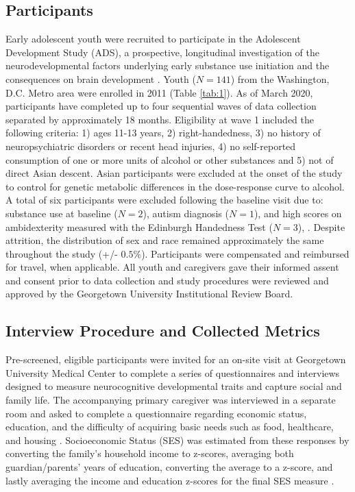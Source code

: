 \documentclass{article}%
\begin{document}
\subsection*{Participants} 
Early adolescent youth were recruited to participate in the Adolescent Development Study (ADS), a prospective, longitudinal investigation of the neurodevelopmental factors underlying early substance use initiation and the consequences on brain development \citep{Fishbein2016}. Youth ($N=141$) from the Washington, D.C. Metro area were enrolled in 2011 (Table \ref{tab:1}). As of March 2020, participants have completed up to four sequential waves of data collection separated by approximately 18 months. Eligibility at wave 1 included the following criteria: 1) ages 11-13 years, 2) right-handedness, 3) no history of neuropsychiatric disorders or recent head injuries, 4) no self-reported consumption of one or more units of alcohol or other substances and 5) not of direct Asian descent. Asian participants were excluded at the onset of the study to control for genetic metabolic differences in the dose-response curve to alcohol. A total of six participants were excluded following the baseline visit due to: substance use at baseline ($N=2$), autism diagnosis ($N=1$), and high scores on ambidexterity measured with the Edinburgh Handedness Test ($N=3$), \citep{veale2014edinburgh}. Despite attrition, the distribution of sex and race remained approximately the same throughout the study (+/- $0.5\%$). Participants were compensated and reimbursed for travel, when applicable. All youth and caregivers gave their informed assent and consent prior to data collection and study procedures were reviewed and approved by the Georgetown University Institutional Review Board. 
\subsection*{Interview Procedure and Collected Metrics} Pre-screened, eligible participants were invited for an on-site visit at Georgetown University Medical Center to complete a series of questionnaires and interviews designed to measure neurocognitive developmental traits and capture social and family life. The accompanying primary caregiver was interviewed in a separate room and asked to complete a questionnaire regarding economic status, education, and the difficulty of acquiring basic needs such as food, healthcare, and housing \citep{bornstein2003socioeconomic}. Socioeconomic Status (SES) was estimated from these responses by converting the family’s household income to z-scores, averaging both guardian/parents' years of education, converting the average to a z-score, and lastly averaging the income and education z-scores for the final SES measure \citep{manuck2010ses}.
\end{document}

